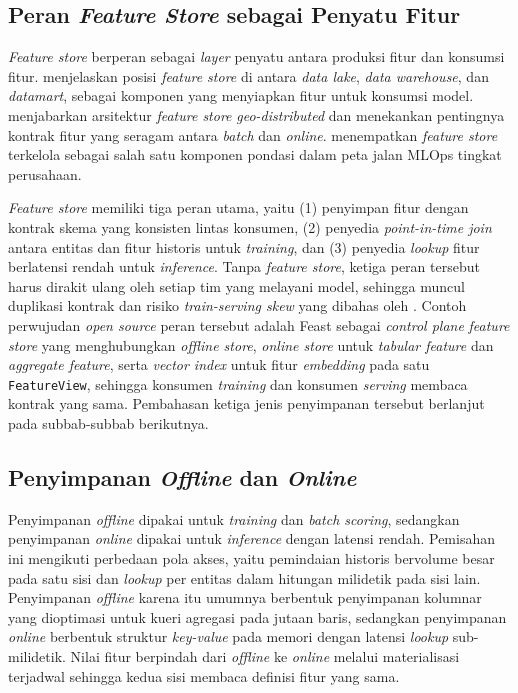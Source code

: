 \subsection{Peran \textit{Feature Store} sebagai Penyatu Fitur}
\label{subsec:konsep-feature-store}

\textit{Feature store} berperan sebagai \textit{layer} penyatu antara produksi fitur dan konsumsi fitur. \textcite{lamer2024data} menjelaskan posisi \textit{feature store} di antara \textit{data lake}, \textit{data warehouse}, dan \textit{datamart}, sebagai komponen yang menyiapkan fitur untuk konsumsi model. \textcite{li2023managed} menjabarkan arsitektur \textit{feature store} \textit{geo-distributed} dan menekankan pentingnya kontrak fitur yang seragam antara \textit{batch} dan \textit{online}. \textcite{kartakis2022aws} menempatkan \textit{feature store} terkelola sebagai salah satu komponen pondasi dalam peta jalan MLOps tingkat perusahaan.

\textit{Feature store} memiliki tiga peran utama, yaitu (1) penyimpan fitur dengan kontrak skema yang konsisten lintas konsumen, (2) penyedia \textit{point-in-time join} antara entitas dan fitur historis untuk \textit{training}, dan (3) penyedia \textit{lookup} fitur berlatensi rendah untuk \textit{inference}. Tanpa \textit{feature store}, ketiga peran tersebut harus dirakit ulang oleh setiap tim yang melayani model, sehingga muncul duplikasi kontrak dan risiko \textit{train-serving skew} yang dibahas oleh \textcite{breck2017ml}. Contoh perwujudan \textit{open source} peran tersebut adalah Feast sebagai \textit{control plane} \textit{feature store} yang menghubungkan \textit{offline store}, \textit{online store} untuk \textit{tabular feature} dan \textit{aggregate feature}, serta \textit{vector index} untuk fitur \textit{embedding} pada satu \texttt{FeatureView}, sehingga konsumen \textit{training} dan konsumen \textit{serving} membaca kontrak yang sama. Pembahasan ketiga jenis penyimpanan tersebut berlanjut pada subbab-subbab berikutnya.

\subsection{Penyimpanan \textit{Offline} dan \textit{Online}}
\label{subsec:offline-online-teori}

Penyimpanan \textit{offline} dipakai untuk \textit{training} dan \textit{batch scoring}, sedangkan penyimpanan \textit{online} dipakai untuk \textit{inference} dengan latensi rendah. Pemisahan ini mengikuti perbedaan pola akses, yaitu pemindaian historis bervolume besar pada satu sisi dan \textit{lookup} per entitas dalam hitungan milidetik pada sisi lain. Penyimpanan \textit{offline} karena itu umumnya berbentuk penyimpanan kolumnar yang dioptimasi untuk kueri agregasi pada jutaan baris, sedangkan penyimpanan \textit{online} berbentuk struktur \textit{key-value} pada memori dengan latensi \textit{lookup} sub-milidetik. Nilai fitur berpindah dari \textit{offline} ke \textit{online} melalui materialisasi terjadwal sehingga kedua sisi membaca definisi fitur yang sama.




